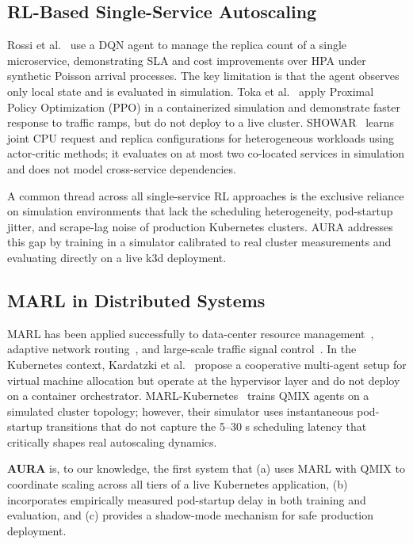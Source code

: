 \documentclass[conference]{IEEEtran}
\begin{document}
\subsection{RL-Based Single-Service Autoscaling}

Rossi et al.~\cite{Rossi2019} use a DQN agent to manage the replica
count of a single microservice, demonstrating SLA and cost
improvements over HPA under synthetic Poisson arrival processes. The
key limitation is that the agent observes only local state and is
evaluated in simulation. Toka et al.~\cite{Toka2021} apply Proximal
Policy Optimization (PPO) in a containerized simulation and
demonstrate faster response to traffic ramps, but do not deploy to a
live cluster. SHOWAR~\cite{Horovitz2022} learns joint CPU request and
replica configurations for heterogeneous workloads using actor-critic
methods; it evaluates on at most two co-located services in simulation
and does not model cross-service dependencies.

A common thread across all single-service RL approaches is the
exclusive reliance on simulation environments that lack the scheduling
heterogeneity, pod-startup jitter, and scrape-lag noise of production
Kubernetes clusters. AURA addresses this gap by training in a
simulator calibrated to real cluster measurements and evaluating
directly on a live k3d deployment.

\subsection{MARL in Distributed Systems}

MARL has been applied successfully to data-center resource
management~\cite{Mao2016}, adaptive network routing~\cite{Valadarsky2017},
and large-scale traffic signal control~\cite{Chu2019}. In the
Kubernetes context, Kardatzki et al.~\cite{Kardatzki2022} propose a
cooperative multi-agent setup for virtual machine allocation but
operate at the hypervisor layer and do not deploy on a container
orchestrator. MARL-Kubernetes~\cite{Chen2023} trains QMIX agents on
a simulated cluster topology; however, their simulator uses
instantaneous pod-startup transitions that do not capture the 5--30 s
scheduling latency that critically shapes real autoscaling dynamics.

\textbf{AURA} is, to our knowledge, the first system that (a) uses
MARL with QMIX to coordinate scaling across all tiers of a live
Kubernetes application, (b) incorporates empirically measured
pod-startup delay in both training and evaluation, and (c) provides
a shadow-mode mechanism for safe production deployment.
\end{document}
